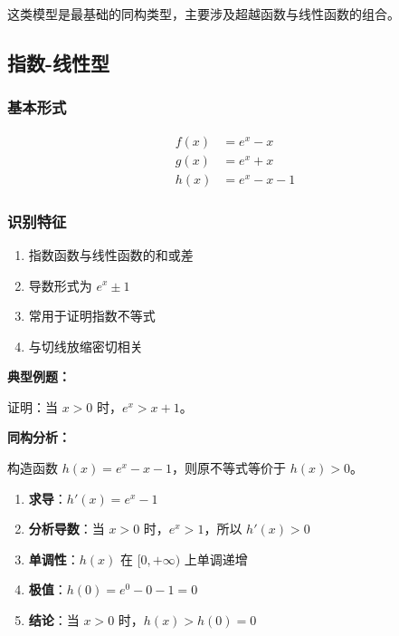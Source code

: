 \documentclass[a4paper,11pt]{ctexrep}
\newcommand{\exampleicon}{\ModeBadge[highlight]{例题}}
\newcommand{\analysisicon}{\ModeBadge[secondary]{分析}}
\theoremstyle{definition}
\begin{document}
这类模型是最基础的同构类型，主要涉及超越函数与线性函数的组合。

\subsection{指数-线性型}

\subsubsection{基本形式}

\begin{definitionbox}[指数-线性型同构]
\begin{align}
f(x) &= e^x - x \\
g(x) &= e^x + x \\
h(x) &= e^x - x - 1
\end{align}
\end{definitionbox}

\subsubsection{识别特征}

\begin{tipbox}[指数-线性型识别要点]
\begin{enumerate}
    \item 指数函数与线性函数的和或差
    \item 导数形式为 $e^x \pm 1$
    \item 常用于证明指数不等式
    \item 与切线放缩密切相关
\end{enumerate}
\end{tipbox}

\exampleicon \textbf{典型例题：}

证明：当 $x > 0$ 时，$e^x > x + 1$。

\analysisicon \textbf{同构分析：}

构造函数 $h(x) = e^x - x - 1$，则原不等式等价于 $h(x) > 0$。

\begin{enumerate}
    \item \textbf{求导}：$h'(x) = e^x - 1$
    \item \textbf{分析导数}：当 $x > 0$ 时，$e^x > 1$，所以 $h'(x) > 0$
    \item \textbf{单调性}：$h(x)$ 在 $[0, +\infty)$ 上单调递增
    \item \textbf{极值}：$h(0) = e^0 - 0 - 1 = 0$
    \item \textbf{结论}：当 $x > 0$ 时，$h(x) > h(0) = 0$
\end{enumerate}
\end{document}

